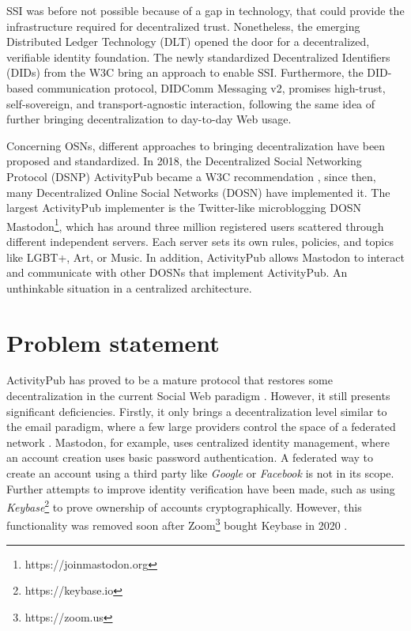 SSI was before not possible because of a gap in technology, that could provide the infrastructure required for decentralized trust. Nonetheless, the emerging Distributed Ledger Technology (DLT) opened the door for a decentralized, verifiable identity foundation. The newly standardized Decentralized Identifiers (DIDs) from the W3C bring an approach to enable SSI. Furthermore, the DID-based communication protocol, DIDComm Messaging v2, promises high-trust, self-sovereign, and transport-agnostic interaction, following the same idea of further bringing decentralization to day-to-day Web usage.

Concerning OSNs, different approaches to bringing decentralization have been proposed and standardized. In 2018, the Decentralized Social Networking Protocol (DSNP) ActivityPub became a W3C recommendation \cite{lemmer-webber_tallon_guy_prodromou_2018}, since then, many Decentralized Online Social Networks (DOSN) have implemented it. The largest ActivityPub implementer is the Twitter-like microblogging DOSN Mastodon\footnote{https://joinmastodon.org}, which has around three million registered users scattered through different independent servers. Each server sets its own rules, policies, and topics like LGBT+, Art, or Music. In addition, ActivityPub allows Mastodon to interact and communicate with other DOSNs that implement ActivityPub. An unthinkable situation in a centralized architecture. 


\section{Problem statement}
 
 ActivityPub has proved to be a mature protocol that restores some decentralization in the current Social Web paradigm \cite{webber_sporny_2017}.  However, it still presents significant deficiencies. Firstly, it only brings a decentralization level similar to the email paradigm, where a few large providers control the space of a federated network \cite{webber_sporny_2017}. Mastodon, for example, uses centralized identity management, where an account creation uses basic password authentication. A federated way to create an account using a third party like \emph{Google} or \emph{Facebook} is not in its scope. Further attempts to improve identity verification have been made, such as using \emph{Keybase}\footnote{https://keybase.io} to prove ownership of accounts cryptographically. However, this functionality was removed soon after Zoom\footnote{https://zoom.us} bought Keybase in 2020 \cite{rochko_2021}. 

